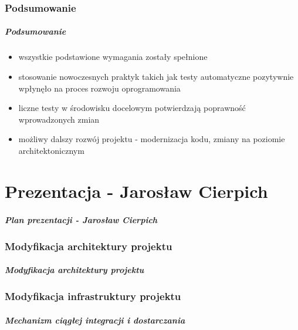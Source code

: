 \documentclass[10pt]{beamer}
\begin{document}
\section{Podsumowanie}

\begin{frame}
\frametitle{Podsumowanie}
\begin{itemize}
    \item wszystkie podstawione wymagania zostały spełnione
    \item stosowanie nowoczesnych praktyk takich jak testy automatyczne pozytywnie wpłynęło na proces rozwoju oprogramowania
    \item liczne testy w środowisku docelowym potwierdzają poprawność wprowadzonych zmian
    \item możliwy dalszy rozwój projektu - modernizacja kodu, zmiany na poziomie architektonicznym
\end{itemize}
\end{frame}


\part{Prezentacja - Jarosław Cierpich}

\begin{frame}
\frametitle{Plan prezentacji - Jarosław Cierpich}
\tableofcontents
\end{frame}

\section{Modyfikacja architektury projektu}

\begin{frame}
\frametitle{Modyfikacja architektury projektu}
\end{frame}


\section{Modyfikacja infrastruktury projektu}

\begin{frame}
\frametitle{Mechanizm ciągłej integracji i dostarczania}
\end{frame}
\end{document}
